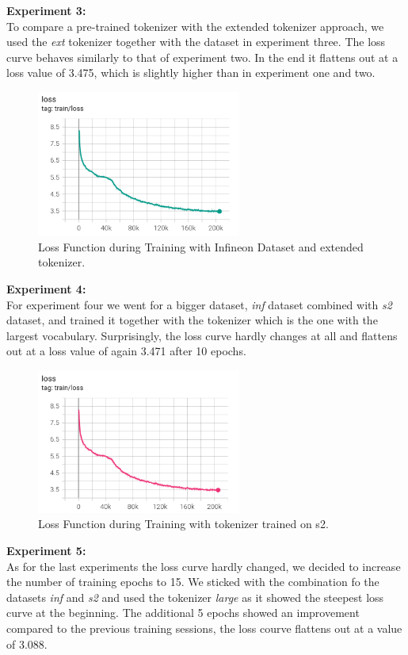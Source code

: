 \textbf{Experiment 3:}\\
To compare a pre-trained tokenizer with the extended tokenizer approach, we used the \textit{ext} tokenizer together with the  dataset in experiment three. The loss curve behaves similarly to that of experiment two. In the end it flattens out at a loss value of 3.475, which is slightly higher than in experiment one and two.
\begin{figure}[H]
	\centering
	\includegraphics[width=0.6\textwidth]{figures/loss_inf_ext.png}
	\caption{Loss Function during Training with Infineon Dataset and extended tokenizer.}
	\label{fig:loss_ext}
\end{figure}

\textbf{Experiment 4:}\\
For experiment four we went for a bigger dataset, \textit{inf} dataset combined with \textit{s2} dataset, and trained it together with the tokenizer  which is the one with the largest vocabulary. Surprisingly, the loss curve hardly changes at all and flattens out at a loss value of again 3.471 after 10 epochs.
\begin{figure}[H]
	\centering
	\includegraphics[width=0.6\textwidth]{figures/loss_infs2_s2.png}
	\caption{Loss Function during Training with tokenizer trained on s2.}
	\label{fig:loss_s2}
\end{figure}

\textbf{Experiment 5:}\\
As for the last experiments the loss curve hardly changed, we decided to increase the number of training epochs to 15. We sticked with the combination fo the datasets \textit{inf} and \textit{s2} and used the tokenizer \textit{large} as it showed the steepest loss curve at the beginning. The additional 5 epochs showed an improvement compared to the previous training sessions, the loss courve flattens out at a value of 3.088.

